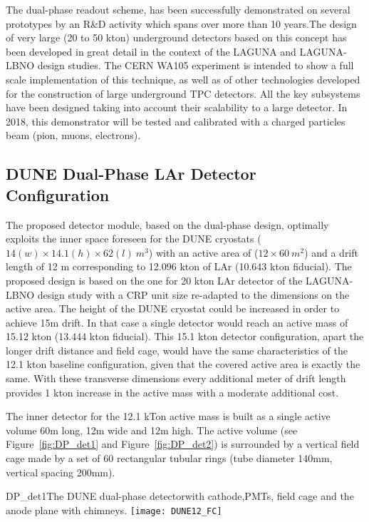 The dual-phase readout scheme, has been successfully demonstrated on several prototypes  by an R\&D activity which spans over more than 10 years.The design of very large (20 to 50 kton) underground detectors based on this concept has been developed in great detail in the context of the LAGUNA and LAGUNA-LBNO design studies.  The CERN WA105 experiment is intended to show a full scale implementation of this technique, as well as of other technologies developed for the construction of large underground TPC detectors.  All the key subsystems have been designed taking into account their scalability to a large detector.  In 2018, this demonstrator will be tested and calibrated with a charged particles beam (pion, muons, electrons).


\subsection{DUNE Dual-Phase LAr Detector Configuration}

The proposed detector module, based on the dual-phase design, optimally exploits the inner space foreseen for the DUNE cryostats ($14 (w) \times 14.1 (h) \times 62  (l)~m^3$) with an active area of  ($12 \times 60 ~m^2$) and a drift length of 12 m corresponding to 12.096 kton of LAr (10.643 kton fiducial). The proposed design is based on the one for 20 kton LAr detector of the LAGUNA-LBNO design study with a CRP unit size re-adapted to the dimensions on the active area. The height of the DUNE cryostat could be increased in order to achieve 15m  drift. In that case a single detector would reach an active mass of 15.12 kton (13.444 kton fiducial).  This 15.1 kton  detector configuration, apart the longer drift distance and field cage, would have the same characteristics of the 12.1 kton baseline configuration, given that  the covered active area is exactly the same. With these transverse dimensions every additional meter of drift length provides 1 kton increase in the active mass with a moderate additional cost.

The inner detector for the 12.1 kTon active mass is built as a single active volume 60m long, 12m wide and 12m high. The active volume (see Figure~\ref{fig:DP_det1} and Figure~\ref{fig:DP_det2}) is surrounded by a vertical field cage made by a set of 60 rectangular tubular rings (tube diameter 140mm, vertical spacing 200mm).

\begin{cdrfigure}{DP_det1}{The DUNE dual-phase detectorwith cathode,PMTs, field cage and the anode plane with chimneys.}
\texttt{[image: DUNE12\_FC]}
\end{cdrfigure}

